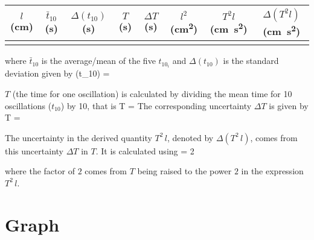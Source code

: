 \documentclass{article}
\begin{document}
      \begin{table}[h]
         \centering

         \begin{tabular}{| c || c | c | c | c || c | c | c ||}

            \hline
            $l$ (\si{\centi\metre}) & $\bar{t}_{10}$ (\si{\second}) & $\Delta(t_{10})$ (\si{\second}) & $T$ (\si{\second}) & $\Delta T$ (\si{\second}) & $l^2$ (\si{\square\centi\metre}) & $T^2 l$ (\si{\centi\metre \square\second}) & $\Delta (T^2 l)$ (\si{\centi\metre \square\second}) \\

            \hline
               & & & & & & & \\
            \hline

         \end{tabular}
      \end{table}
      where $\bar{t}_{10}$ is the average/mean of the five $t_{10_i}$ and $\Delta (t_{10})$ is the standard deviation given by
      \beq \label{calc_Dt10}
         \Delta (t_{10}) = 
      \eeq
         
      
      $T$ (the time for one oscillation) is calculated by dividing the mean time for 10 oscillations ($t_{10}$) by 10, that is
      \beq \label{calc_T}
         T = 
      \eeq
      The corresponding uncertainty $\Delta T$ is given by
      \beq
         \Delta T = 
      \eeq

      The uncertainty in the derived quantity $T^2 \, l$, denoted by $\Delta (T^2 \, l)$, comes from this uncertainty $\Delta T$ in $T$. It is calculated using
      \beq \label{calc_DT2l}
          = 2 
      \eeq
      
      where the factor of $2$ comes from $T$ being raised to the power $2$ in the expression $T^2 \, l$.


   \section*{Graph}
\end{document}
